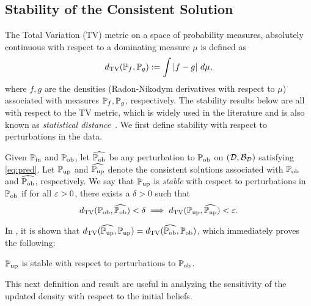 
\subsection{Stability of the Consistent Solution}\label{sec:stability}
The Total Variation (TV) metric on a space of probability measures, absolutely continuous with respect to a dominating measure $\mu$ is defined as
\begin{equation}\label{eq:tv}
d_{\text{TV}} (\mathbb{P}_f, \mathbb{P}_g) := \int \left\vert f - g\right\vert \, d\mu,
\end{equation}
where $f,g$ are the densities (Radon-Nikodym derivatives with respect to $\mu$) associated with measures $\mathbb{P}_f, \mathbb{P}_g$, respectively.
The stability results below are all with respect to the TV metric, which is widely used in the literature and is also known as \emph{statistical distance}~\cite{GS02, Smith, Silverman}.
We first define stability with respect to perturbations in the data.

\begin{defn}\label{defn:stableobs}
  Given $\operatorname*{\mathbb{P}_{in}}$ and $\operatorname*{\mathbb{P}_{ob}}$, let $\widehat{\operatorname*{\mathbb{P}_{ob}}}$ be any perturbation to $\operatorname*{\mathbb{P}_{ob}}$ on $(\mathcal{D}, \mathcal{B}_{\mathcal{D}})$ satisfying \eqref{eq:pred}.
  Let $\operatorname*{\mathbb{P}_{up}}$ and $\widehat{\operatorname*{\mathbb{P}_{up}}}$ denote the consistent solutions associated with $\operatorname*{\mathbb{P}_{ob}}$ and $\widehat{\operatorname*{\mathbb{P}_{ob}}}$, respectively.
  We say that $\operatorname*{\mathbb{P}_{up}}$ is \emph{stable} with respect to perturbations in $\operatorname*{\mathbb{P}_{ob}}$ if for all $\varepsilon > 0$, there exists a $\delta > 0$ such that
  \begin{equation}
    d_{\text{TV}} (\operatorname*{\mathbb{P}_{ob}}, \widehat{\operatorname*{\mathbb{P}_{ob}}}) < \delta \implies d_{\text{TV}} (\operatorname*{\mathbb{P}_{up}}, \widehat{\operatorname*{\mathbb{P}_{up}}}) < \varepsilon.
  \end{equation}
\end{defn}

In \cite{BJW18}, it is shown that $d_{\text{TV}} (\widehat{\operatorname*{\mathbb{P}_{up}}}, \operatorname*{\mathbb{P}_{up}}) = d_{\text{TV}} (\widehat{\operatorname*{\mathbb{P}_{ob}}}, \operatorname*{\mathbb{P}_{ob}})$, which immediately proves the following:

\begin{thm}
  $\operatorname*{\mathbb{P}_{up}}$ is stable with respect to perturbations to $\operatorname*{\mathbb{P}_{ob}}$.
  \label{thm:stableobs}
\end{thm}

This next definition and result are useful in analyzing the sensitivity of the updated density with respect to the initial beliefs.

